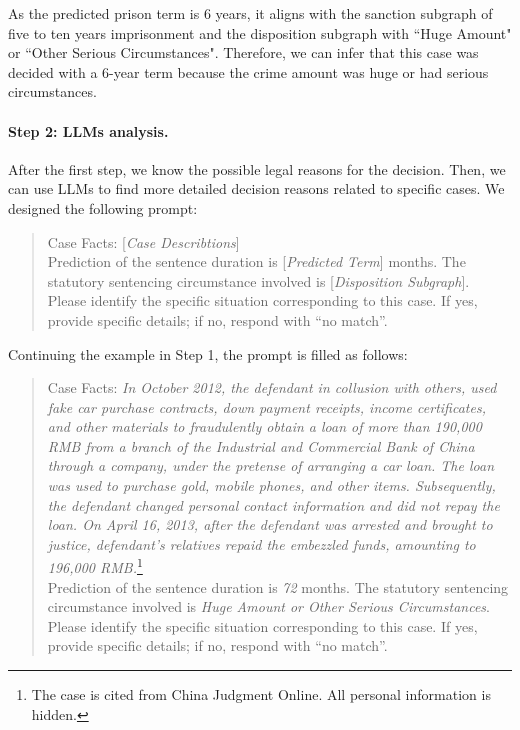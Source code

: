 As the predicted prison term is 6 years, it aligns with the sanction subgraph of five to ten years imprisonment and the disposition subgraph with ``Huge Amount" or ``Other Serious Circumstances". Therefore, we can infer that this case was decided with a 6-year term because the crime amount was huge or had serious circumstances.

\paragraph{Step 2: LLMs analysis.} After the first step, we know the possible legal reasons for the decision. Then, we can use LLMs to find more detailed decision reasons related to specific cases. We designed the following prompt:
\begin{quote}
    Case Facts: [\textit{Case Describtions}]\\
    Prediction of the sentence duration is [\textit{Predicted Term}] months. The statutory sentencing circumstance involved is [\textit{Disposition Subgraph}]. Please identify the specific situation corresponding to this case. If yes, provide specific details; if no, respond with ``no match''.
\end{quote}

Continuing the example in Step 1, the prompt is filled as follows:
\begin{quote}
    Case Facts: \textit{In October 2012, the defendant in collusion with others, used fake car purchase contracts, down payment receipts, income certificates, and other materials to fraudulently obtain a loan of more than 190,000 RMB from a branch of the Industrial and Commercial Bank of China through a company, under the pretense of arranging a car loan. The loan was used to purchase gold, mobile phones, and other items. Subsequently, the defendant changed personal contact information and did not repay the loan. On April 16, 2013, after the defendant was arrested and brought to justice, defendant's relatives repaid the embezzled funds, amounting to 196,000 RMB.}\footnote{The case is cited from China Judgment Online. All personal information is hidden.}\\
    Prediction of the sentence duration is \textit{72} months. The statutory sentencing circumstance involved is \textit{Huge Amount or Other Serious Circumstances}. Please identify the specific situation corresponding to this case. If yes, provide specific details; if no, respond with ``no match''.
\end{quote}


